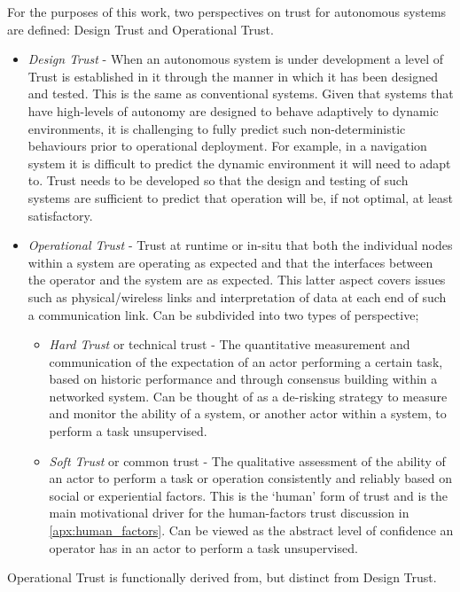 For the purposes of this work, two perspectives on trust for autonomous systems are defined: Design Trust and Operational Trust.

\begin{itemize}
  \item \emph{Design Trust} - When an autonomous system is under development a level of Trust is established in it through the manner in which it has been designed and tested.
    This is the same as conventional systems.
    Given that systems that have high-levels of autonomy are designed to behave adaptively to dynamic environments, it is challenging to fully predict such non-deterministic behaviours prior to operational deployment.
    For example, in a navigation system it is difficult to predict the dynamic environment it will need to adapt to.
    Trust needs to be developed so that the design and testing of such systems are sufficient to predict that operation will be, if not optimal, at least satisfactory.

  \item \emph{Operational Trust} - Trust at runtime or in-situ that both the individual nodes within a system are operating as expected and that the interfaces between the operator and the system are as expected.
    This latter aspect covers issues such as physical/wireless links and interpretation of data at each end of such a communication link.
    Can be subdivided into two types of perspective;
    \begin{itemize}
      \item \emph{Hard Trust} or technical trust - The quantitative measurement and communication of the expectation of an actor performing a certain task, based on historic performance and through consensus building within a networked system.
    Can be thought of as a de-risking strategy to measure and monitor the ability of a system, or another actor within a system, to perform a task unsupervised.
  \item \emph{Soft Trust} or common trust - The qualitative assessment of the ability of an actor to perform a task or operation consistently and reliably based on social or experiential factors.
    This is the ‘human’ form of trust and is the main motivational driver for the human-factors trust discussion in \autoref{apx:human_factors}.
    Can be viewed as the abstract level of confidence an operator has in an actor to perform a task unsupervised.
    \end{itemize}
\end{itemize}
Operational Trust is functionally derived from, but distinct from Design Trust.

